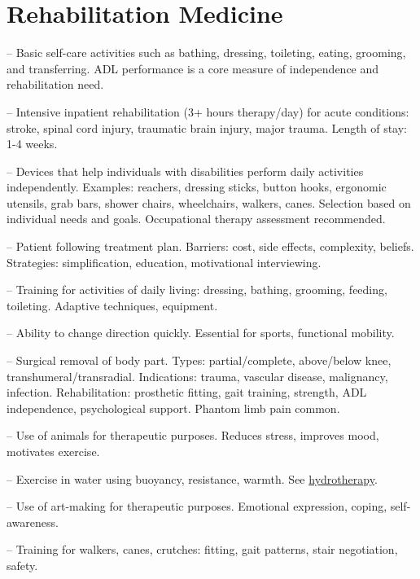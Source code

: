 \chapter{Rehabilitation Medicine}

-- Basic self-care activities such as bathing, dressing, toileting, eating, grooming, and transferring. ADL performance is a core measure of independence and rehabilitation need.

-- Intensive inpatient rehabilitation (3+ hours therapy/day) for acute conditions: stroke, spinal cord injury, traumatic brain injury, major trauma. Length of stay: 1-4 weeks.

-- Devices that help individuals with disabilities perform daily activities independently. Examples: reachers, dressing sticks, button hooks, ergonomic utensils, grab bars, shower chairs, wheelchairs, walkers, canes. Selection based on individual needs and goals. Occupational therapy assessment recommended.


-- Patient following treatment plan. Barriers: cost, side effects, complexity, beliefs. Strategies: simplification, education, motivational interviewing.

-- Training for activities of daily living: dressing, bathing, grooming, feeding, toileting. Adaptive techniques, equipment.

-- Ability to change direction quickly. Essential for sports, functional mobility.

-- Surgical removal of body part. Types: partial/complete, above/below knee, transhumeral/transradial. Indications: trauma, vascular disease, malignancy, infection. Rehabilitation: prosthetic fitting, gait training, strength, ADL independence, psychological support. Phantom limb pain common.

-- Use of animals for therapeutic purposes. Reduces stress, improves mood, motivates exercise.

-- Exercise in water using buoyancy, resistance, warmth. See \hyperlink{Hydrotherapy}{hydrotherapy}.

-- Use of art-making for therapeutic purposes. Emotional expression, coping, self-awareness.

-- Training for walkers, canes, crutches: fitting, gait patterns, stair negotiation, safety.

